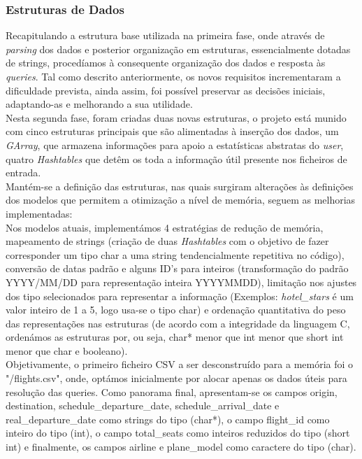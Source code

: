 \documentclass[12pt,a4paper]{article}
\begin{document}
    \subsubsection{Estruturas de Dados}
    \hspace{0,6cm}

    Recapitulando a estrutura base utilizada na primeira fase, onde através de \textit{parsing} dos dados e posterior organização em estruturas, essencialmente dotadas de strings, procedíamos à consequente organização dos dados e resposta às \textit{queries}. Tal como descrito anteriormente, os novos requisitos incrementaram a dificuldade prevista, ainda assim, foi possível preservar as decisões iniciais, adaptando-as e melhorando a sua utilidade. \\

    Nesta segunda fase, foram criadas duas novas estruturas, o projeto está munido com cinco estruturas principais que são alimentadas à inserção dos dados, um \textit{GArray}, que armazena informações para apoio a estatísticas abstratas do \textit{user}, quatro \textit{Hashtables} que detêm os toda a informação útil presente nos ficheiros de entrada. \\

    Mantém-se a definição das estruturas, nas quais surgiram alterações às definições dos modelos que permitem a otimização a nível de memória, seguem as melhorias implementadas: \\

    Nos modelos atuais, implementámos 4 estratégias de redução de memória, mapeamento de strings (criação de duas \textit{Hashtables} com o objetivo de fazer corresponder um tipo char a uma string tendencialmente repetitiva no código), conversão de datas padrão e alguns ID's para inteiros (transformação do padrão YYYY/MM/DD para representação inteira YYYYMMDD), limitação nos ajustes dos tipo selecionados para representar a informação (Exemplos: \textit{hotel\_stars} é um valor inteiro de 1 a 5, logo usa-se o tipo char) e ordenação quantitativa do peso das representações nas estruturas (de acordo com a integridade da linguagem C, ordenámos as estruturas por, ou seja, char* menor que int menor que short int menor que char e booleano). \\

    Objetivamente, o primeiro ficheiro CSV a ser desconstruído para a memória foi o "/flights.csv", onde, optámos inicialmente por alocar apenas os dados úteis para resolução das queries. Como panorama final, apresentam-se os campos origin, destination, schedule\_departure\_date, schedule\_arrival\_date e real\_departure\_date como strings do tipo (char*), o campo flight\_id como inteiro do tipo (int), o campo total\_seats como inteiros reduzidos do tipo (short int) e finalmente, os campos airline e plane\_model como caractere do tipo (char).\\
\end{document}
